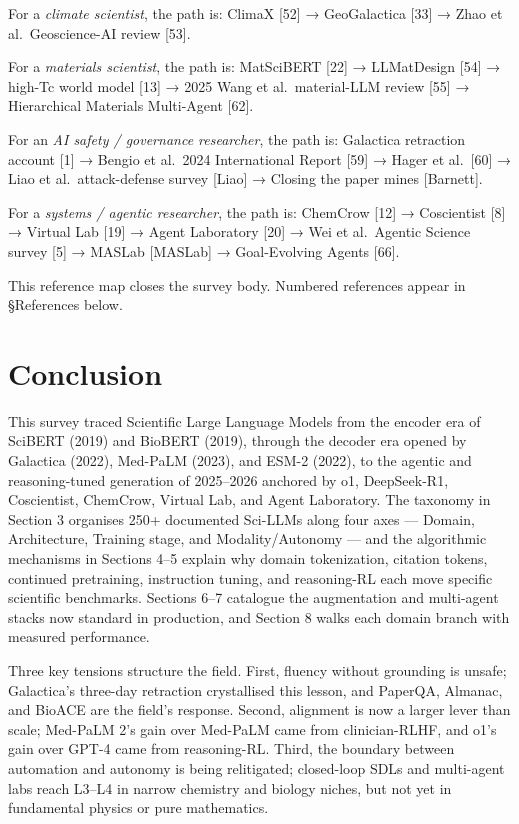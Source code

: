 For a \emph{climate scientist}, the path is: ClimaX {[}52{]} → GeoGalactica {[}33{]} → Zhao et al.~Geoscience-AI review {[}53{]}.

For a \emph{materials scientist}, the path is: MatSciBERT {[}22{]} → LLMatDesign {[}54{]} → high-Tc world model {[}13{]} → 2025 Wang et al.~material-LLM review {[}55{]} → Hierarchical Materials Multi-Agent {[}62{]}.

For an \emph{AI safety / governance researcher}, the path is: Galactica retraction account {[}1{]} → Bengio et al.~2024 International Report {[}59{]} → Hager et al.~{[}60{]} → Liao et al.~attack-defense survey {[}Liao{]} → Closing the paper mines {[}Barnett{]}.

For a \emph{systems / agentic researcher}, the path is: ChemCrow {[}12{]} → Coscientist {[}8{]} → Virtual Lab {[}19{]} → Agent Laboratory {[}20{]} → Wei et al.~Agentic Science survey {[}5{]} → MASLab {[}MASLab{]} → Goal-Evolving Agents {[}66{]}.

This reference map closes the survey body. Numbered references appear in §References below.

\section{Conclusion}\label{conclusion}

This survey traced Scientific Large Language Models from the encoder era of SciBERT (2019) and BioBERT (2019), through the decoder era opened by Galactica (2022), Med-PaLM (2023), and ESM-2 (2022), to the agentic and reasoning-tuned generation of 2025--2026 anchored by o1, DeepSeek-R1, Coscientist, ChemCrow, Virtual Lab, and Agent Laboratory. The taxonomy in Section 3 organises 250+ documented Sci-LLMs along four axes --- Domain, Architecture, Training stage, and Modality/Autonomy --- and the algorithmic mechanisms in Sections 4--5 explain why domain tokenization, citation tokens, continued pretraining, instruction tuning, and reasoning-RL each move specific scientific benchmarks. Sections 6--7 catalogue the augmentation and multi-agent stacks now standard in production, and Section 8 walks each domain branch with measured performance.

Three key tensions structure the field. First, fluency without grounding is unsafe; Galactica's three-day retraction crystallised this lesson, and PaperQA, Almanac, and BioACE are the field's response. Second, alignment is now a larger lever than scale; Med-PaLM 2's gain over Med-PaLM came from clinician-RLHF, and o1's gain over GPT-4 came from reasoning-RL. Third, the boundary between automation and autonomy is being relitigated; closed-loop SDLs and multi-agent labs reach L3--L4 in narrow chemistry and biology niches, but not yet in fundamental physics or pure mathematics.

